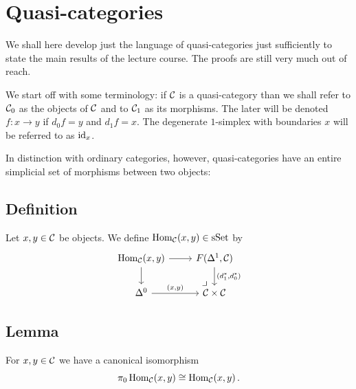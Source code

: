 \chapter{Quasi-categories}

    We shall here develop just the language of quasi-categories just sufficiently to state the main results of the lecture course. The proofs are still very much out of reach.
    
    We start off with some terminology: if $\mathcal{C}$ is a quasi-category than we shall refer to $\mathcal{C}_0$ as the objects of $\mathcal{C}$ and to $\mathcal{C}_1$ as its morphisms. The later will be denoted $f \colon x \to y$ if $d_0f = y$ and $d_1f = x$. The degenerate $1$-simplex with boundaries $x$ will be referred to as $\operatorname{id}_x$.
    
    In distinction with ordinary categories, however, quasi-categories have an entire simplicial set of morphisms between two objects:

    \section{Definition}
        Let $x, y \in \mathcal{C}$ be objects. We define $\operatorname{Hom}_{\mathcal{C}}(x, y) \in \operatorname{sSet}$ by
        \begin{equation*}
            \begin{tikzcd}
                \Hom_{\Cc}(x, y) \arrow[r] \arrow[d]
                \arrow[dr, phantom, "\pb", very near end, end anchor={[xshift=-1ex]north}]
                & F(\Delta^1, \Cc) \arrow{d}{(d_1^*, d_0^*)} \\
                \Delta^0 \arrow{r}{(x,y)}
                & \Cc \times \Cc
            \end{tikzcd}        
        \end{equation*}

    \section{Lemma}
        For $x, y \in \mathcal{C}$ we have a canonical isomorphism
        \begin{equation*}
            \pi_0 \operatorname{Hom}_{\mathcal{C}}(x, y) \cong \operatorname{Hom}_{\mathcal{C}}(x, y) \,.
        \end{equation*}
        \smallskip

